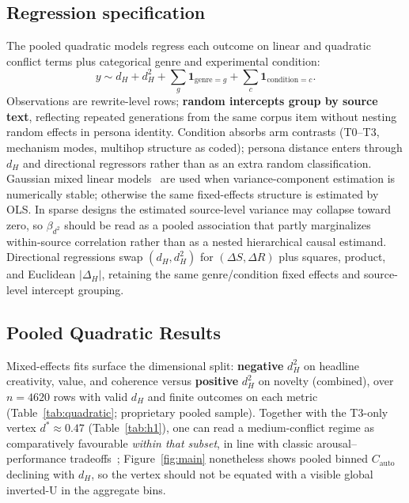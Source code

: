\documentclass[sigconf,nonacm]{acmart}
\begin{document}
\subsection{Regression specification}

The pooled quadratic models regress each outcome on linear and quadratic conflict terms plus categorical genre and experimental condition:
\[
  y \sim d_H + d_H^2 + \sum_g \mathbf{1}_{\mathrm{genre}=g} + \sum_c \mathbf{1}_{\mathrm{condition}=c}.
\]
Observations are rewrite-level rows; \textbf{random intercepts group by source text}, reflecting repeated generations from the same corpus item without nesting random effects in persona identity. Condition absorbs arm contrasts (T0--T3, mechanism modes, multihop structure as coded); persona distance enters through $d_H$ and directional regressors rather than as an extra random classification. Gaussian mixed linear models~\cite{bates2015} are used when variance-component estimation is numerically stable; otherwise the same fixed-effects structure is estimated by OLS. In sparse designs the estimated source-level variance may collapse toward zero, so $\beta_{d^2}$ should be read as a pooled association that partly marginalizes within-source correlation rather than as a nested hierarchical causal estimand.
Directional regressions swap $(d_H,d_H^2)$ for $(\Delta S,\Delta R)$ plus squares, product, and Euclidean $|\Delta_H|$, retaining the same genre/condition fixed effects and source-level intercept grouping.

\subsection{Pooled Quadratic Results}

Mixed-effects fits surface the dimensional split: \textbf{negative} $d_H^2$ on headline creativity, value, and coherence versus \textbf{positive} $d_H^2$ on novelty (combined), over $n{=}4620$ rows with valid $d_H$ and finite outcomes on each metric (Table~\ref{tab:quadratic}; proprietary pooled sample).
Together with the T3-only vertex $d^\ast{\approx}0.47$ (Table~\ref{tab:h1}), one can read a medium-conflict regime as comparatively favourable \emph{within that subset}, in line with classic arousal--performance tradeoffs~\cite{yerkes}; Figure~\ref{fig:main} nonetheless shows pooled binned $C_{\mathrm{auto}}$ declining with $d_H$, so the vertex should not be equated with a visible global inverted-U in the aggregate bins.
\end{document}
